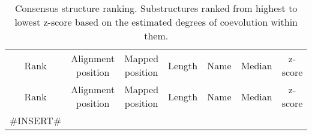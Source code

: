 \documentclass[12pt]{article}
\begin{document}
	\begin{longtable}{ccccccc}
		\captionsetup{justification=centering}
		\caption{\label{tab:rankingshape} Consensus structure ranking. Substructures ranked from highest to lowest z-score based on the estimated degrees of coevolution within them.}\\
		\toprule
		Rank & Alignment position & Mapped position & Length & Name & Median & z-score\\
		\midrule
		\endfirsthead
		\toprule
		Rank & Alignment position  & Mapped position & Length & Name & Median & z-score\\
		\midrule
		\endhead
#INSERT#	\end{longtable}
\end{document}
